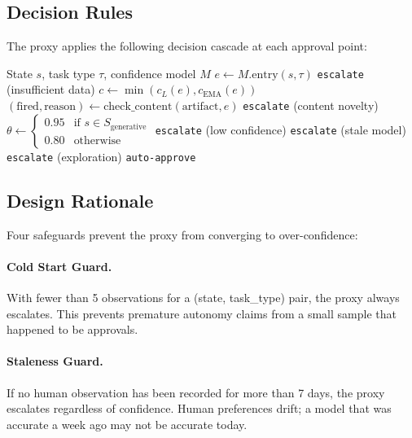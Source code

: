 \documentclass[11pt,a4paper]{article}
\begin{document}
\subsection{Decision Rules}

The proxy applies the following decision cascade at each approval point:

\begin{algorithm}
\caption{Human Proxy Decision}
\label{alg:proxy}
\begin{algorithmic}[1]
\REQUIRE State $s$, task type $\tau$, confidence model $M$
\STATE $e \gets M.\text{entry}(s, \tau)$
    \RETURN \texttt{escalate} (insufficient data)
\ENDIF
\STATE $c \gets \min(c_L(e), c_{\text{EMA}}(e))$
    \STATE $(\text{fired}, \text{reason}) \gets \text{check\_content}(\text{artifact}, e)$
        \RETURN \texttt{escalate} (content novelty)
    \ENDIF
\ENDIF
\STATE $\theta \gets \begin{cases}
    0.95 & \text{if } s \in S_{\text{generative}} \\
    0.80 & \text{otherwise}
\end{cases}$
    \RETURN \texttt{escalate} (low confidence)
\ENDIF
{}
    \RETURN \texttt{escalate} (stale model)
\ENDIF
{}
    \RETURN \texttt{escalate} (exploration)
\ENDIF
\RETURN \texttt{auto-approve}
\end{algorithmic}
\end{algorithm}

\subsection{Design Rationale}

Four safeguards prevent the proxy from converging to over-confidence:

\paragraph{Cold Start Guard.}
With fewer than 5 observations for a (state, task\_type) pair, the
proxy always escalates. This prevents premature autonomy claims from
a small sample that happened to be approvals.

\paragraph{Staleness Guard.}
If no human observation has been recorded for more than 7 days, the
proxy escalates regardless of confidence. Human preferences drift;
a model that was accurate a week ago may not be accurate today.
\end{document}
